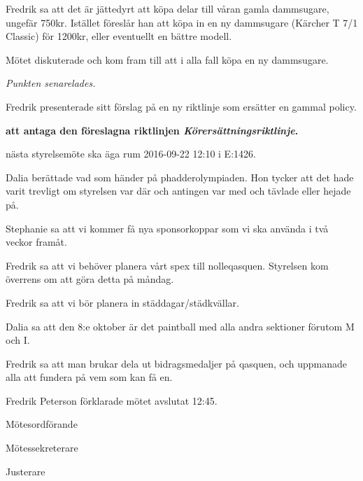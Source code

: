 \documentclass[10pt]{article}
\def\mo{Fredrik Peterson}
\def\ms{Erik Månsson}
\def\ji{Anders Nilsson}
\begin{document}
\begin{paragrafer}
\begin{paragrafer}
\end{paragrafer}

Fredrik sa att det är jättedyrt att köpa delar till våran gamla dammsugare, ungefär 750kr. Istället föreslår han att köpa in en ny dammsugare (Kärcher T 7/1 Classic) för 1200kr, eller eventuellt en bättre modell.

Mötet diskuterade och kom fram till att i alla fall köpa en ny dammsugare.

\emph{Punkten senarelades.}

Fredrik presenterade sitt förslag på en ny riktlinje som ersätter en gammal policy.

\textbf{\Mba att antaga den föreslagna riktlinjen \textit{Körersättningsriktlinje}.}

\Mba nästa styrelsemöte ska äga rum 2016-09-22 12:10 i E:1426.

\Ibfu

Dalia berättade vad som händer på phadderolympiaden. Hon tycker att det hade varit trevligt om styrelsen var där och antingen var med och tävlade eller hejade på.

Stephanie sa att vi kommer få nya sponsorkoppar som vi ska använda i två veckor framåt.

Fredrik sa att vi behöver planera vårt spex till nolleqasquen. Styrelsen kom överrens om att göra detta på måndag.

Fredrik sa att vi bör planera in städdagar/städkvällar.

Dalia sa att den 8:e oktober är det paintball med alla andra sektioner förutom M och I.

Fredrik sa att man brukar dela ut bidragsmedaljer på qasquen, och uppmanade alla att fundera på vem som kan få en.

{\mo} förklarade mötet avslutat 12:45.

\end{paragrafer}

\hidesignfoot
\begin{signatures}{3}
\signature{\mo}{Mötesordförande}
\signature{\ms}{Mötessekreterare}
\signature{\ji}{Justerare}
\end{signatures}
\end{document}
